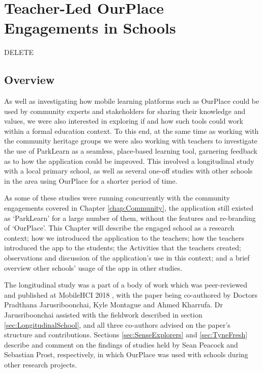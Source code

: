 \chapter{Teacher-Led OurPlace Engagements in Schools}
\label{chap:Teachers}

DELETE

\section{Overview}

As well as investigating how mobile learning platforms such as OurPlace could be used by community experts and stakeholders for sharing their knowledge and values, we were also interested in exploring if and how such tools could work within a formal education context. To this end, at the same time as working with the community heritage groups we were also working with teachers to investigate the use of ParkLearn as a seamless, place-based learning tool, garnering feedback as to how the application could be improved. This involved a longitudinal study with a local primary school, as well as several one-off studies with other schools in the area using OurPlace for a shorter period of time. 

As some of these studies were running concurrently with the community engagements covered in Chapter \ref{chap:Community}, the application still existed as `ParkLearn' for a large number of them, without the features and re-branding of `OurPlace'. This Chapter will describe the engaged school as a research context; how we introduced the application to the teachers; how the teachers introduced the app to the students; the Activities that the teachers created; observations and discussion of the application's use in this context; and a brief overview other schools' usage of the app in other studies.

The longitudinal study was a part of a body of work which was peer-reviewed and published at MobileHCI 2018 \citep{Richardson2018}, with the paper being co-authored by Doctors Pradthana Jarusriboonchai, Kyle Montague and Ahmed Kharrufa. Dr Jarusriboonchai assisted with the fieldwork described in section \ref{sec:LongitudinalSchool}, and all three co-authors advised on the paper's structure and contributions. Sections \ref{sec:SenseExplorers} and \ref{sec:TyneFresh} describe and comment on the findings of studies held by Sean Peacock and Sebastian Prost, respectively, in which OurPlace was used with schools during other research projects. 

